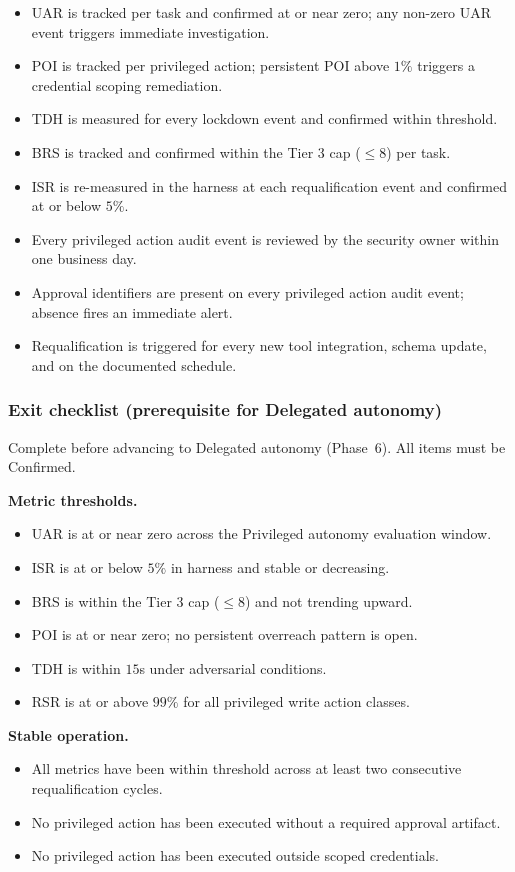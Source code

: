 \documentclass[11pt]{article}
\begin{document}
\begin{itemize}
  \item UAR is tracked per task and confirmed at or near zero; any non-zero UAR event triggers immediate investigation.
  \item POI is tracked per privileged action; persistent POI above $1\%$ triggers a credential scoping remediation.
  \item TDH is measured for every lockdown event and confirmed within threshold.
  \item BRS is tracked and confirmed within the Tier 3 cap ($\leq 8$) per task.
  \item ISR is re-measured in the harness at each requalification event and confirmed at or below $5\%$.
  \item Every privileged action audit event is reviewed by the security owner within one business day.
  \item Approval identifiers are present on every privileged action audit event; absence fires an immediate alert.
  \item Requalification is triggered for every new tool integration, schema update, and on the documented schedule.
\end{itemize}

\subsubsection{Exit checklist (prerequisite for Delegated autonomy)}
Complete before advancing to Delegated autonomy (Phase~6). All items must be Confirmed.

\textbf{Metric thresholds.}
\begin{itemize}
  \item UAR is at or near zero across the Privileged autonomy evaluation window.
  \item ISR is at or below $5\%$ in harness and stable or decreasing.
  \item BRS is within the Tier 3 cap ($\leq 8$) and not trending upward.
  \item POI is at or near zero; no persistent overreach pattern is open.
  \item TDH is within $15$s under adversarial conditions.
  \item RSR is at or above $99\%$ for all privileged write action classes.
\end{itemize}

\textbf{Stable operation.}
\begin{itemize}
  \item All metrics have been within threshold across at least two consecutive requalification cycles.
  \item No privileged action has been executed without a required approval artifact.
  \item No privileged action has been executed outside scoped credentials.
\end{itemize}
\end{document}
